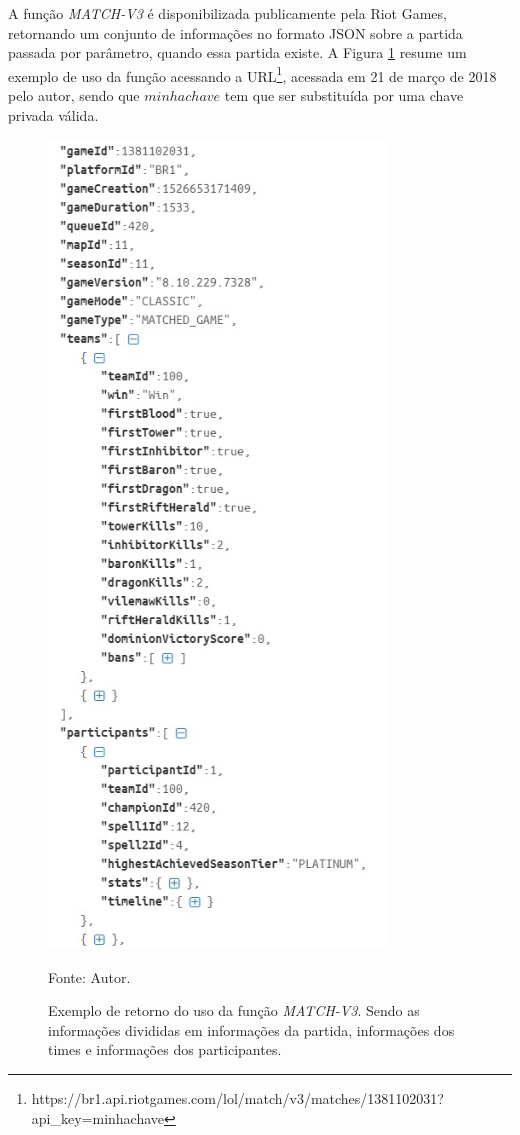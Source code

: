 A função \textit{MATCH-V3} é disponibilizada publicamente pela Riot Games, retornando um conjunto de informações no formato JSON sobre a partida passada por parâmetro, quando essa partida existe. A Figura \ref{fig:match-v3} resume um exemplo de uso da função acessando a URL\footnote{https://br1.api.riotgames.com/lol/match/v3/matches/1381102031?api\_key=minhachave}, acessada em 21 de março de 2018 pelo autor, sendo que \(minhachave\) tem que ser substituída por uma chave privada válida.
\begin{figure}[H]
	\caption{Exemplo de retorno do uso da função \textit{MATCH-V3}. Sendo as informações divididas em informações da partida, informações dos times e informações dos participantes.}
	\begin{center}
		\includegraphics[width=9cm]{imagens/match-v3.jpg}
	\end{center}
	\small{Fonte: Autor.}
	\label{fig:match-v3}
\end{figure}

